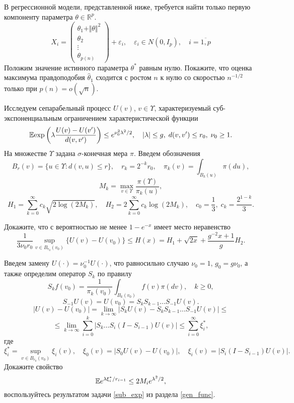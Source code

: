 \begin{problem}
В регрессионной модели, представленной ниже, требуется найти только первую компоненту параметра $\theta \in \mathbb{R}^p$. 
\[
X_i =  \begin{pmatrix}
  \theta_1 + \Vert \theta \Vert^2 \\
  \theta_2   \\
  \vdots  \\
  \theta_{p(n)}  
 \end{pmatrix} + \varepsilon_i, 
\quad \varepsilon_i  \in N(0, I_p), 
\quad i = \overline{1,p}
\]
Положим значение истинного параметра $\theta^*$ равным нулю.
Покажите, что  оценка максимума правдоподобия $\widehat{\theta}_1$ сходится с ростом $n$ к нулю со скоростью $n^{-1/2}$ только при $p(n) = o(\sqrt{n})$.
\end{problem}




\begin{problem}
\label{ed_local_u}
Исследуем сепарабельный процесс $U(v)$, $v \in \Upsilon$,  характеризуемый суб-экспоненциальным ограничением характеристической функции
\[
\mathrm{{\mathbb E}} \text{exp} \left( \lambda \frac{U(v) - U(v')}{d(v,v')} \right) \leq e^{\nu_0^2 \lambda^2 / 2},
\quad |\lambda| \leq g, \; d(v, v') \leq r_0, \; \nu_0 \geq 1. 
\]
На множестве $\Upsilon$ задана $\sigma$-конечная мера $\pi$. Введем обозначения 
\[
B_r(v) = \{u \in \Upsilon: d(v,u) \leq r\}, 
\quad
r_k = 2^{-k} r_0,
\quad
\pi_k(v) = \int_{B_k(u)} \pi (du), 
\]
\[
M_k = \max_{v \in \Upsilon} \frac{\pi(\Upsilon)}{\pi_k(u)},
\]
\[
H_1 = \sum_{k=0}^{\infty} c_k \sqrt{2 \log (2M_k)}, 
\quad H_2 = 2 \sum_{k=0}^{\infty} c_k  \log (2M_k),
\quad
c_0 = \frac{1}{3}, \;
c_k = \frac{2^{1-k}}{3}.
\]

Докажите, что с вероятностью не менее $1 - e^{-x}$ имеет место неравенство
\[
\frac{1}{3 \nu_0 r_0} \sup_{v \in B_{r_0}(v_0)}\{ U(v) - U(v_0)\} \leq H(x) = 
H_1 + \sqrt{2x} + \frac{g^{-2} x + 1}{g} H_2.
\]
\end{problem}

\begin{ordre}
Введем замену $U(\cdot) = \nu_0^{-1} U(\cdot)$, что равносильно случаю 
$\nu_0  = 1$, $g_0 = g\nu_0$, а также определим оператор $S_k$ по правилу
\[
S_k f(v_0) = \frac{1}{\pi_k(v_0)} \int_{B_k(v_0)} f(v) \pi (dv),
\quad k \geq 0,
\]
\[
S_{-1} U(v) = U(v_0) = S_k S_{k-1} \ldots S_{-1} U(v). 
\]
\[
|U(v) - U(v_0)| = \lim_{k\to\infty} |S_k U(v) -  S_k S_{k-1} \ldots S_{-1} U(v)| \leq 
\]
\[
\leq \lim_{k\to\infty} \sum_{i = 0}^k |S_k \ldots S_{i} (I - S_{i-1}) U(v)|  \leq \sum_{i = 0}^{\infty} \xi_i^{*},
\]
где
\[
\xi_i^{*} = \sup_{v \in B_{r_0}(v_0)} \xi_i(v),
\quad
 \xi_0(v) = | S_{0} U(v) - U(v_0) |,
 \quad
 \xi_i(v) = | S_{i} (I - S_{i-1}) U(v) |. 
\]
Докажите свойство
\[
\mathrm{{\mathbb E}} e^{\lambda \xi_i^{*} / r_{i-1}} \leq 2M_i e^{\lambda^2/2},
\]
воспользуйтесь результатом задачи \ref{sub_exp} из раздела \ref{gen_func}.

\end{ordre}

